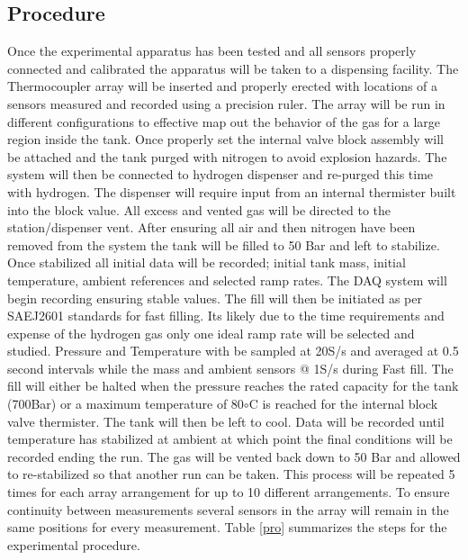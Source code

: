 \documentclass[paper=a4, fontsize=11pt, abstract=on]{scrartcl}
\numberwithin{equation}{section}		%
\numberwithin{figure}{section}			%
\numberwithin{table}{section}				%
\begin{document}
\subsection{Procedure}
Once the experimental apparatus has been tested and all sensors properly connected and calibrated the apparatus will be taken to a dispensing facility. The Thermocoupler array will be inserted and properly erected with locations of a sensors measured and recorded using a precision ruler. The array will be run in different configurations to effective map out the behavior of the gas for a large region inside the tank. Once properly set the internal valve block assembly will be attached and the tank purged with nitrogen to avoid explosion hazards. The system will then be connected to hydrogen dispenser and re-purged this time with hydrogen. The dispenser will require input from an internal thermister built into the block value. All excess and vented gas will be directed to the station/dispenser vent. After ensuring all air and then nitrogen have been removed from the system the tank will be filled to 50 Bar and left to stabilize. Once stabilized all initial data will be recorded; initial tank mass, initial temperature, ambient references and selected ramp rates. The DAQ system will begin recording ensuring stable values. The fill will then be initiated as per SAEJ2601 standards for fast filling. Its likely due to the time requirements and expense of the hydrogen gas only one ideal ramp rate will be selected and studied. Pressure and Temperature with be sampled at 20S/s and averaged at 0.5 second intervals while the mass and ambient sensors @ 1S/s during Fast fill. The fill will either be halted when the pressure reaches the rated capacity for the tank (700Bar) or a maximum temperature of 80$\circ$C is reached for the internal block valve thermister. The tank will then be left to cool. Data will be recorded until temperature has stabilized at ambient at which point the final conditions will be recorded ending the run. The gas will be vented back down to 50 Bar and allowed to re-stabilized so that another run can be taken. This process will be repeated 5 times for each array arrangement for up to 10 different arrangements. To ensure continuity between measurements several sensors in the array will remain in the same positions for every measurement. Table \ref{pro} summarizes the steps for the experimental procedure.
\end{document}
